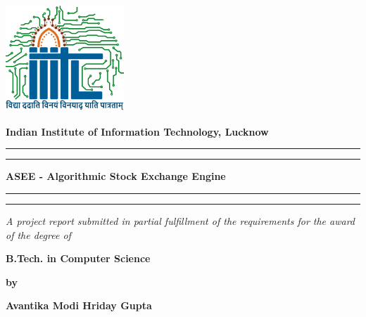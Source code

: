 \thispagestyle{empty}

\setcounter{page}{1}

\def\thepage{\roman{page}}

\begin{center}
    \includegraphics[height=4cm]{./Images/Logo_IIITL.png}
    
    \vspace{.5cm}
    {\bf\large{Indian Institute of Information Technology, Lucknow}}\\
    {\bf{}}

     \vspace{1.8cm}
    \rule[0.5ex]{\linewidth}{2pt}\vspace*{-\baselineskip}\vspace*{3.2pt}
    \rule[0.5ex]{\linewidth}{2pt}
    
    \vspace*{3.2pt}

    {\Large\bf ASEE - Algorithmic Stock Exchange Engine}

    \vspace*{3.2pt}
    
    \rule[0.5ex]{\linewidth}{2pt}\vspace*{-\baselineskip}\vspace*{3.2pt}
    \rule[0.5ex]{\linewidth}{2pt}
    
    \vspace{1.5cm}
    
    \textit{{A project report submitted in partial fulfillment of the requirements 
    for the award of the degree of}}
    
    \vspace{1cm}
    
    {\bf B.Tech. in Computer Science}
    
    \vspace{1cm}
    
    {\bf by}
    
    \vspace{0.8cm}
    
    {\bf {Avantika Modi} \hspace{0.3cm} \bf {Hriday Gupta}}
    

\end{center}

